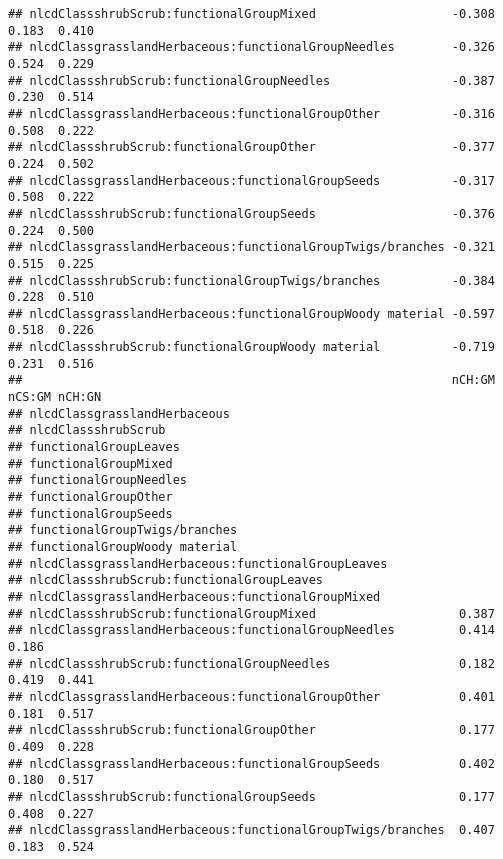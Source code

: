 \documentclass[]{article}
\begin{document}
\begin{verbatim}
## nlcdClassshrubScrub:functionalGroupMixed                   -0.308  0.183  0.410
## nlcdClassgrasslandHerbaceous:functionalGroupNeedles        -0.326  0.524  0.229
## nlcdClassshrubScrub:functionalGroupNeedles                 -0.387  0.230  0.514
## nlcdClassgrasslandHerbaceous:functionalGroupOther          -0.316  0.508  0.222
## nlcdClassshrubScrub:functionalGroupOther                   -0.377  0.224  0.502
## nlcdClassgrasslandHerbaceous:functionalGroupSeeds          -0.317  0.508  0.222
## nlcdClassshrubScrub:functionalGroupSeeds                   -0.376  0.224  0.500
## nlcdClassgrasslandHerbaceous:functionalGroupTwigs/branches -0.321  0.515  0.225
## nlcdClassshrubScrub:functionalGroupTwigs/branches          -0.384  0.228  0.510
## nlcdClassgrasslandHerbaceous:functionalGroupWoody material -0.597  0.518  0.226
## nlcdClassshrubScrub:functionalGroupWoody material          -0.719  0.231  0.516
##                                                            nCH:GM nCS:GM nCH:GN
## nlcdClassgrasslandHerbaceous                                                   
## nlcdClassshrubScrub                                                            
## functionalGroupLeaves                                                          
## functionalGroupMixed                                                           
## functionalGroupNeedles                                                         
## functionalGroupOther                                                           
## functionalGroupSeeds                                                           
## functionalGroupTwigs/branches                                                  
## functionalGroupWoody material                                                  
## nlcdClassgrasslandHerbaceous:functionalGroupLeaves                             
## nlcdClassshrubScrub:functionalGroupLeaves                                      
## nlcdClassgrasslandHerbaceous:functionalGroupMixed                              
## nlcdClassshrubScrub:functionalGroupMixed                    0.387              
## nlcdClassgrasslandHerbaceous:functionalGroupNeedles         0.414  0.186       
## nlcdClassshrubScrub:functionalGroupNeedles                  0.182  0.419  0.441
## nlcdClassgrasslandHerbaceous:functionalGroupOther           0.401  0.181  0.517
## nlcdClassshrubScrub:functionalGroupOther                    0.177  0.409  0.228
## nlcdClassgrasslandHerbaceous:functionalGroupSeeds           0.402  0.180  0.517
## nlcdClassshrubScrub:functionalGroupSeeds                    0.177  0.408  0.227
## nlcdClassgrasslandHerbaceous:functionalGroupTwigs/branches  0.407  0.183  0.524

\end{verbatim}
\end{document}
